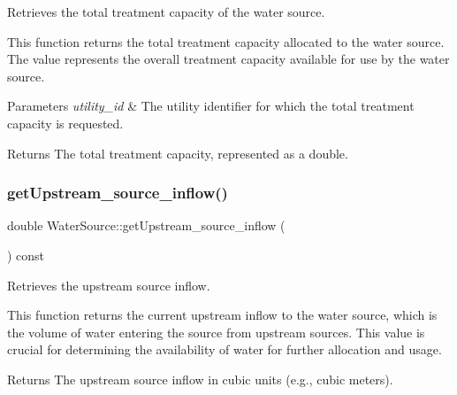 Retrieves the total treatment capacity of the water source. 

This function returns the total treatment capacity allocated to the water source. The value represents the overall treatment capacity available for use by the water source.


\begin{DoxyParams}{Parameters}
{\em utility\+\_\+id} & The utility identifier for which the total treatment capacity is requested.\\
\hline
\end{DoxyParams}
\begin{DoxyReturn}{Returns}
The total treatment capacity, represented as a double. 
\end{DoxyReturn}
\mbox{\label{classWaterSource_ad7e60efd7395f8d3e674e602226e5ac1}} 
\subsubsection{\texorpdfstring{get\+Upstream\+\_\+source\+\_\+inflow()}{getUpstream\_source\_inflow()}}
{\footnotesize\ttfamily double Water\+Source\+::get\+Upstream\+\_\+source\+\_\+inflow (\begin{DoxyParamCaption}{ }\end{DoxyParamCaption}) const}



Retrieves the upstream source inflow. 

This function returns the current upstream inflow to the water source, which is the volume of water entering the source from upstream sources. This value is crucial for determining the availability of water for further allocation and usage.

\begin{DoxyReturn}{Returns}
The upstream source inflow in cubic units (e.\+g., cubic meters). 
\end{DoxyReturn}
\mbox{\label{classWaterSource_afd2a153ba8f4ecaa9f8fa851d5a1727c}} 
